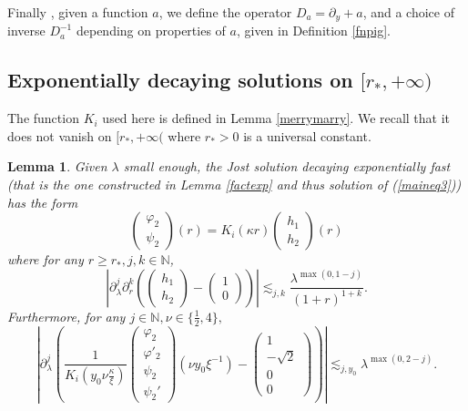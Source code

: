 \documentclass[11 pt]{amsart}
\newtheorem{lem}{Lemma}[section]
\theoremstyle{definition}
\theoremstyle{remark}
\numberwithin{equation}{section}
\begin{document}
Finally , given a function $a$, we define the operator $D_a = \partial_y + a$,
and a choice of inverse $D_a^{- 1}$ depending on properties of $a$, given in
Definition \ref{fnpig}.

\subsection{Exponentially decaying solutions on $[r_\ast, + \infty )$}

The function $K_i$ used here is defined in Lemma \ref{merrymarry}. We recall that it does not vanish on $[r_\ast,+\infty($ where $r_\ast > 0$ is a universal constant.

\begin{lem}
  \label{alegant} Given $\lambda$ small enough, the Jost solution decaying exponentially fast (that is the one constructed in Lemma \ref{factexp} and thus solution of (\ref{maineq3})) has the form
  \[ \left(\begin{array}{c}
       \varphi_2\\
       \psi_2
     \end{array}\right) (r) = K_i (\kappa r) \left(\begin{array}{c}
       h_1\\
       h_2
     \end{array}\right) (r) \]
  where for any $r \geqslant r_\ast, j, k \in \mathbb{N}$,
  \[ \left| \partial_{\lambda}^j \partial_r^k \left( \left(\begin{array}{c}
       h_1\\
       h_2
     \end{array}\right) - \left(\begin{array}{c}
       1\\
       0
     \end{array}\right) \right) \right| \lesssim_{j, k} \frac{\lambda^{\max
     (0, 1 - j)}}{(1 + r)^{1 + k}} . \]
  Furthermore, for any $j \in \mathbb{N}, \nu \in \{ \frac 12, 4 \},$
  \[ \left| \partial_{\lambda}^j \left( \frac{1}{K_i \left( y_0\nu
     \frac{\kappa}{\xi} \right)} \left(\begin{array}{c}
       \varphi_2\\
       \varphi'_2\\
       \psi_2\\
       \psi_2'
     \end{array}\right) (\nu y_0 \xi^{- 1}) - \left(\begin{array}{c}
       1\\
       - \sqrt{2}\\
       0\\
       0
     \end{array}\right) \right) \right| \lesssim_{j,y_0} \lambda^{\max (0, 2 - j)} .
  \]
\end{lem}
\end{document}
